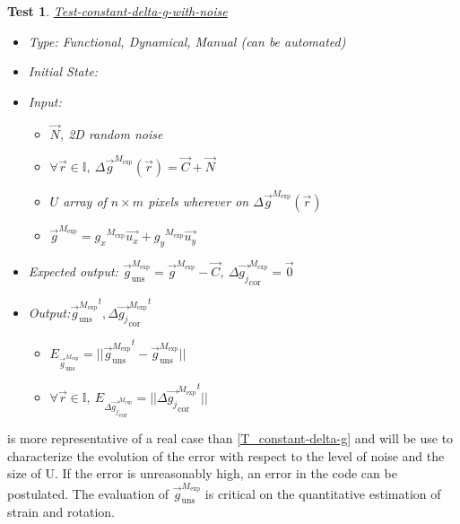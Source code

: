 \documentclass[12pt, titlepage]{article}
\newtheorem{Test}{Test}
\begin{document}
\begin{Test}\normalfont\underline{Test-constant-delta-g-with-noise}
\label{T_constant-delta-g-with-noise}
\begin{itemize}
\item Type: Functional, Dynamical, Manual (can be automated)
\item Initial State: 
\item Input: 
	\begin{itemize}
	\item $\overrightarrow{N}$, 2D random noise
	\item $\forall \vec{r} \in \mathbb{I}, \ \Delta \overrightarrow{g}^{M_{\text{exp}}}(\vec{r})=\overrightarrow{C} + \overrightarrow{N}$
	\item $U$ array of $n \times m$ pixels wherever on $\Delta \overrightarrow{g}^{M_{\text{exp}}}(\vec{r})$ 
	\item $\overrightarrow{g}^{M_{\text{exp}}}={g_x}^{M_{\text{exp}}}\overrightarrow{u_x}+{g_y}^{M_{\text{exp}}}\overrightarrow{u_y}$
	\end{itemize}
\item Expected output: $\overrightarrow{g}_{\text{uns}}^{M_{\text{exp}}}=\overrightarrow{g}^{M_{\text{exp}}}-\overrightarrow{C}$,  $\Delta\overrightarrow{g_{j}}_{\text{cor}}^{M_{\text{exp}}}=\overrightarrow{0}$
\item Output:${\overrightarrow{g}_{\text{uns}}^{M_{\text{exp}}}}^{t}, {\Delta\overrightarrow{g_{j}}_{\text{cor}}^{M_{\text{exp}}}}^{t}$
	\begin{itemize}
	\item $E_{\overrightarrow{g}_{\text{uns}}^{M_{\text{exp}}}}=||{\overrightarrow{g}_{\text{uns}}^{M_{\text{exp}}}}^{t}-\overrightarrow{g}_{\text{uns}}^{M_{\text{exp}}}||$
	\item $\forall \vec{r} \in \mathbb{I}, \ E_{\Delta\overrightarrow{g_{j}}_{\text{cor}}^{M_{\text{exp}}}}=||{\Delta\overrightarrow{g_{j}}_{\text{cor}}^{M_{\text{exp}}}}^{t}||$
	\end{itemize}
\end{itemize}
\end{Test}

 is more representative of a real case than \cref{T_constant-delta-g} and will be use to characterize the evolution of the error with respect to the level of noise and the size of U. If the error is unreasonably high, an error in the code can be postulated. The evaluation of $\overrightarrow{g}_{\text{uns}}^{M_{\text{exp}}}$ is critical on the quantitative estimation of strain and rotation.
\end{document}
